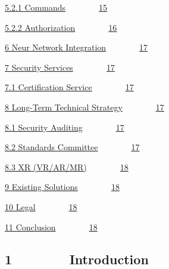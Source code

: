\documentclass[]{article}
\begin{document}
{\protect\hyperlink{h.mxiezstpuut}{5.2.1
Commands}}{~~~~~~~~}{\protect\hyperlink{h.mxiezstpuut}{15}}

{\protect\hyperlink{h.4z2bok2i8gzr}{5.2.2
Authorization}}{~~~~~~~~}{\protect\hyperlink{h.4z2bok2i8gzr}{16}}

{\protect\hyperlink{h.1otrvur1822q}{6 Neur Network
Integration}}{~~~~~~~~}{\protect\hyperlink{h.1otrvur1822q}{17}}

{\protect\hyperlink{h.bzvzzht64u2y}{7 Security
Services}}{~~~~~~~~}{\protect\hyperlink{h.bzvzzht64u2y}{17}}

{\protect\hyperlink{h.abkm0ffjqjrl}{7.1 Certification
Service}}{~~~~~~~~}{\protect\hyperlink{h.abkm0ffjqjrl}{17}}

{\protect\hyperlink{h.ene1l8rtlw39}{8 Long-Term Technical
Strategy}}{~~~~~~~~}{\protect\hyperlink{h.ene1l8rtlw39}{17}}

{\protect\hyperlink{h.qtopow1tsp61}{8.1 Security
Auditing}}{~~~~~~~~}{\protect\hyperlink{h.qtopow1tsp61}{17}}

{\protect\hyperlink{h.t07ugrvxhyau}{8.2 Standards
Committee}}{~~~~~~~~}{\protect\hyperlink{h.t07ugrvxhyau}{17}}

{\protect\hyperlink{h.kh7k2j9rg21u}{8.3 XR
(VR/AR/MR)}}{~~~~~~~~}{\protect\hyperlink{h.kh7k2j9rg21u}{18}}

{\protect\hyperlink{h.p22xyrugj08v}{9 Existing
Solutions}}{~~~~~~~~}{\protect\hyperlink{h.p22xyrugj08v}{18}}

{\protect\hyperlink{h.b8e6udtezd1d}{10
Legal}}{~~~~~~~~}{\protect\hyperlink{h.b8e6udtezd1d}{18}}

{\protect\hyperlink{h.1mof4p3a8sna}{11
Conclusion}}{~~~~~~~~}{\protect\hyperlink{h.1mof4p3a8sna}{18}}

{}

{}

{}

{}

{}

{}

\hypertarget{h.m3z59tk1hxxt}{%
\subsection{\texorpdfstring{{}}{}}\label{h.m3z59tk1hxxt}}

{}

{}

\hypertarget{h.k8evwgrqtimr}{%
\subsection{\texorpdfstring{{1~~~~~~~~Introduction}}{1~~~~~~~~Introduction}}\label{h.k8evwgrqtimr}}
\end{document}
